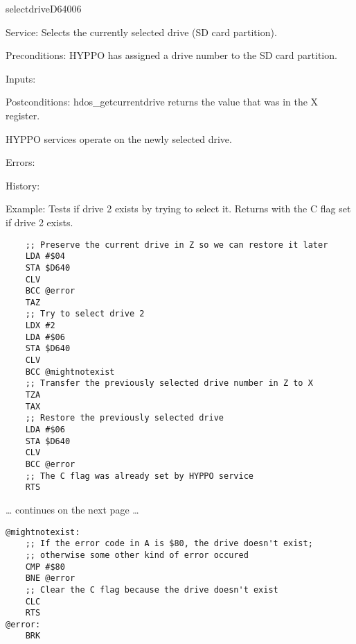 \newpage
\begin{hyppotrap}{selectdrive}{D640}{06}
\item [Service:]
  Selects the currently selected drive (SD card partition).
\item [Preconditions:]
  HYPPO has assigned a drive number to the SD card partition.
\item [Inputs:]
\item [Postconditions:]
  hdos\_getcurrentdrive returns the value that was in the X register.

  HYPPO services operate on the newly selected drive.
\item [Errors:]
\item [History:]
\item [Example:]
  Tests if drive 2 exists by trying to select it. Returns with the C flag set if
  drive 2 exists.

\begin{tcolorbox}[colback=black,coltext=white]
\verbatimfont{\codefont}
\begin{verbatim}
    ;; Preserve the current drive in Z so we can restore it later
    LDA #$04
    STA $D640
    CLV
    BCC @error
    TAZ
    ;; Try to select drive 2
    LDX #2
    LDA #$06
    STA $D640
    CLV
    BCC @mightnotexist
    ;; Transfer the previously selected drive number in Z to X
    TZA
    TAX
    ;; Restore the previously selected drive
    LDA #$06
    STA $D640
    CLV
    BCC @error
    ;; The C flag was already set by HYPPO service
    RTS
\end{verbatim}
\end{tcolorbox}

\ldots{} continues on the next page \ldots

\begin{tcolorbox}[colback=black,coltext=white]
\verbatimfont{\codefont}
\begin{verbatim}
@mightnotexist:
    ;; If the error code in A is $80, the drive doesn't exist;
    ;; otherwise some other kind of error occured
    CMP #$80
    BNE @error
    ;; Clear the C flag because the drive doesn't exist
    CLC
    RTS
@error:
    BRK
\end{verbatim}
\end{tcolorbox}
\end{hyppotrap}


